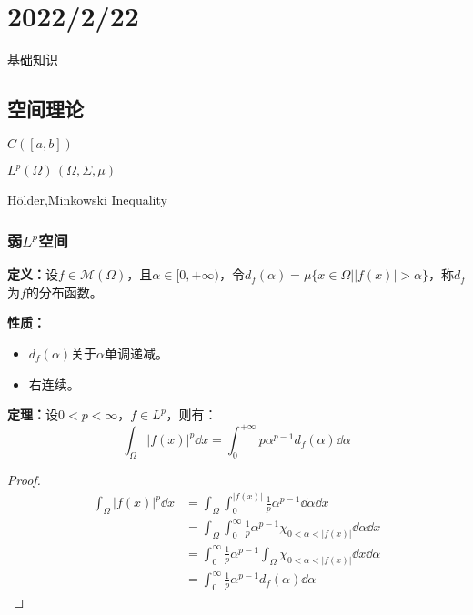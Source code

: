 \section{2022/2/22}

基础知识
\subsection{空间理论}

$C([a,b])$
\par
$L^p(\Omega)\, (\Omega,\Sigma,\mu)$
\par
H{\"o}lder,Minkowski Inequality
\par
\subsubsection{弱$L^p$空间}
\par
{\bfseries 定义：}设$f\in \mathcal{M}(\Omega)$，且$\alpha\in[0,+\infty)$，令$d_f(\alpha)=\mu\{x\in\Omega\big| |f(x)|>\alpha\}$，称$d_f$为$f$的分布函数。
\par
{\bfseries 性质：}
\begin{itemize}
    \item $d_f(\alpha)$关于$\alpha$单调递减。
    \item 右连续。
\end{itemize}

{\bfseries 定理：}设$0<p<\infty$，$f\in L^p$，则有：
\begin{equation*}
    \int_{\Omega}|f(x)|^p\dd x=\int_0^{+\infty}p\alpha^{p-1}d_f(\alpha)\dd \alpha
\end{equation*}

\begin{proof}
    \begin{equation*}
        \begin{aligned}
            \int_{\Omega}|f(x)|^p\dd x&=\int_{\Omega}\int_{0}^{|f(x)|}\frac{1}{p}\alpha^{p-1}\dd \alpha \dd x\\
            &=\int_{\Omega}\int_{0}^{\infty}\frac{1}{p}\alpha^{p-1}\chi_{0<\alpha<|f(x)|}\dd \alpha \dd x\\
            &=\int_{0}^{\infty}\frac{1}{p}\alpha^{p-1}\int_{\Omega}\chi_{0<\alpha<|f(x)|}\dd x\dd \alpha \\
            &=\int_{0}^{\infty}\frac{1}{p}\alpha^{p-1}d_f(\alpha)\dd \alpha
        \end{aligned}
    \end{equation*}
\end{proof}

